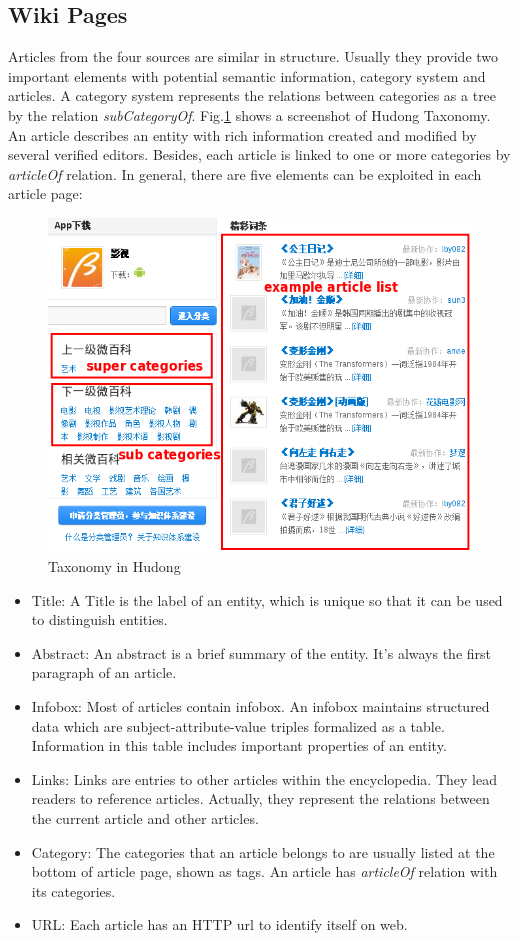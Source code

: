 \documentclass[runningheads,a4paper]{llncs}
\begin{document}
\subsection{Wiki Pages}
Articles from the four sources are similar in structure. Usually they provide two important elements with potential semantic information, category system and articles. A category system represents the relations between categories as a tree by the relation \textit{subCategoryOf}. Fig.\ref{fig:hudong-taxonomy} shows a screenshot of Hudong Taxonomy. An article describes an entity with rich information created and modified by several verified editors. Besides, each article is linked to one or more categories by \textit{articleOf} relation. In general, there are five elements can be exploited in each article page:
\begin{figure}
    \centering
    \begin{minipage}[t]{0.8\textwidth}
        \centerline{\includegraphics[width=0.8\columnwidth]{fig/hudong-taxonomy2}}
        \caption{Taxonomy in Hudong}
        \label{fig:hudong-taxonomy}
    \end{minipage}%
\end{figure}
\begin{itemize}
  \item Title: A Title is the label of an entity, which is unique so that it can be used to distinguish entities.
  \item Abstract: An abstract is a brief summary of the entity. It's always the first paragraph of an article. 
  \item Infobox: Most of articles contain infobox. An infobox maintains structured data which are subject-attribute-value triples formalized as a table. Information in this table includes important properties of an entity.
  \item Links: Links are entries to other articles within the encyclopedia. They lead readers to reference articles. Actually, they represent the relations between the current article and other articles.
  \item Category: The categories that an article belongs to are usually listed at the bottom of article page, shown as tags. An article has \textit{articleOf} relation with its categories.
  \item URL: Each article has an HTTP url to identify itself on web.
\end{itemize}
\end{document}

